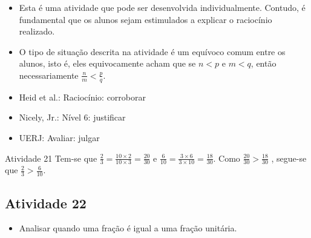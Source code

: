 
\begin{itemize} %
    \item       Esta é uma atividade que pode ser desenvolvida individualmente.
Contudo, é fundamental que os alunos sejam estimulados a explicar o raciocínio
realizado.
    \item       O tipo de situação descrita na atividade é um equívoco comum
entre os alunos, isto é, eles equivocamente acham que se       $n < p$       e
    $m < q$, então necessariamente       $\frac{n}{m} < \frac{p}{q}$.
\end{itemize} %


   \vspace{.1cm}

 \vspace{.1cm}

\begin{itemize} %
    \item       Heid et al.: Raciocínio: corroborar
    \item       Nicely, Jr.: Nível 6: justificar
    \item       UERJ: Avaliar: julgar
\end{itemize} %


\begin{resposta*}{Atividade 21}
  Tem-se que   $\frac{2}{3} = \frac{10 \times 2}{10 \times 3} = \frac{20}{30}$
e
  $\frac{6}{10} = \frac{3 \times 6}{3 \times 10} = \frac{18}{30}$.
  Como   $\frac{20}{30} > \frac{18}{30}$  , segue-se que   $\frac{2}{3} >
\frac{6}{10}$.
\end{resposta*}

\subsection{Atividade 22}

\begin{itemize} %
    \item       Analisar quando uma fração é igual a uma fração unitária.
\end{itemize} %



